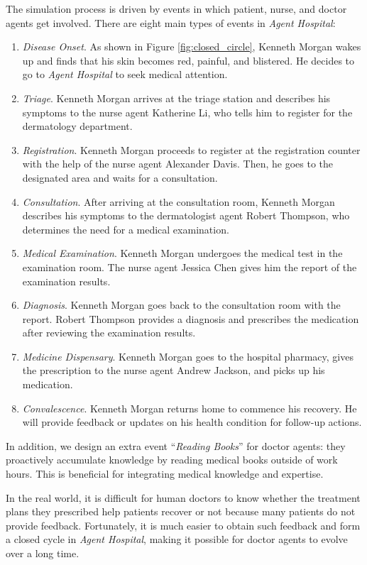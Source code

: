 \documentclass[fleqn,12pt]{wlscirep}
\begin{document}
The simulation process is driven by events in which patient, nurse, and doctor agents get involved. There are eight main types of events in {\it Agent Hospital}:
\begin{enumerate}
\item {\it Disease Onset}. As shown in Figure \ref{fig:closed_circle}, Kenneth Morgan wakes up and finds that his skin becomes red, painful, and blistered. He decides to go to {\it Agent Hospital} to seek medical attention.
\item {\it Triage}. Kenneth Morgan arrives at the triage station and describes his symptoms to the nurse agent Katherine Li, who tells him to register for the dermatology department.
\item {\it Registration}. Kenneth Morgan proceeds to register at the registration counter with the help of the nurse agent Alexander Davis. Then, he goes to the designated area and waits for a consultation.
\item {\it Consultation}. After arriving at the consultation room, Kenneth Morgan describes his symptoms to the dermatologist agent Robert Thompson, who determines the need for a medical examination.
\item {\it Medical Examination}. Kenneth Morgan undergoes the medical test in the examination room. The nurse agent Jessica Chen gives him the report of the examination results.
\item {\it Diagnosis}. Kenneth Morgan goes back to the consultation room with the report. Robert Thompson provides a diagnosis and prescribes the medication after reviewing the examination results.
\item {\it Medicine Dispensary}. Kenneth Morgan goes to the hospital pharmacy, gives the prescription to the nurse agent Andrew Jackson, and picks up his medication.
\item {\it Convalescence}. Kenneth Morgan returns home to commence his recovery. He will provide feedback or updates on his health condition for follow-up actions.
\end{enumerate}
In addition, we design an extra event ``{\it Reading Books}'' for doctor agents: they proactively accumulate knowledge by reading medical books outside of work hours. This is beneficial for integrating medical knowledge and expertise. 

In the real world, it is difficult for human doctors to know whether the treatment plans they prescribed help patients recover or not because many patients do not provide feedback. Fortunately, it is much easier to obtain such feedback and form a closed cycle in {\it Agent Hospital}, making it possible for doctor agents to evolve over a long time. 
\end{document}
